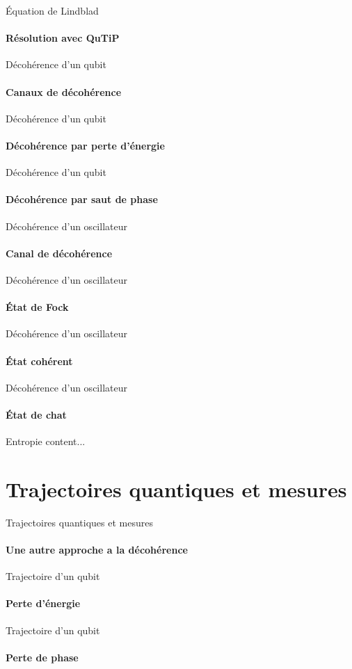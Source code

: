 \documentclass[11pt]{beamer}
\begin{document}
\begin{frame}{Équation de Lindblad}
\framesubtitle{Résolution avec QuTiP}
\end{frame}

\begin{frame}{Décohérence d'un qubit}
\framesubtitle{Canaux de décohérence}
\end{frame}

\begin{frame}{Décohérence d'un qubit}
\framesubtitle{Décohérence par perte d'énergie}
\end{frame}

\begin{frame}{Décohérence d'un qubit}
\framesubtitle{Décohérence par saut de phase}
\end{frame}


\begin{frame}{Décohérence d'un oscillateur}
\framesubtitle{Canal de décohérence}
\end{frame}

\begin{frame}{Décohérence d'un oscillateur}
\framesubtitle{État de Fock}
\end{frame}

\begin{frame}{Décohérence d'un oscillateur}
\framesubtitle{État cohérent}
\end{frame}

\begin{frame}{Décohérence d'un oscillateur}
\framesubtitle{État de chat}
\end{frame}

\begin{frame}{Entropie}
content...
\end{frame}

\section{Trajectoires quantiques et mesures}

\begin{frame}{Trajectoires quantiques et mesures}
\framesubtitle{Une autre approche a la décohérence}
\end{frame}

\begin{frame}{Trajectoire d'un qubit}
\framesubtitle{Perte d'énergie}
\end{frame}

\begin{frame}{Trajectoire d'un qubit}
\framesubtitle{Perte de phase}
\end{frame}
\end{document}
